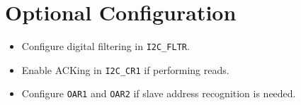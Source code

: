 \documentclass[12pt]{article}
\begin{document}
\section*{Optional Configuration}
\begin{itemize}
  \item Configure digital filtering in \texttt{I2C\_FLTR}.
  \item Enable ACKing in \texttt{I2C\_CR1} if performing reads.
  \item Configure \texttt{OAR1} and \texttt{OAR2} if slave address recognition is needed.
\end{itemize}
\end{document}
